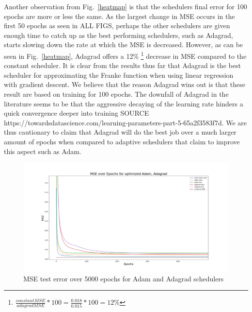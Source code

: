 \documentclass[onecolumn,10pt,cleanfoot]{asme2ej}
\begin{document}
Another observation from Fig.~\ref{heatmap} is that the schedulers final error for 100 epochs are more or less the same. As the largest change in MSE occurs in the first 50 epochs as seen in ALL FIGS, perhaps the other schedulers are given enough time to catch up as the best performing schedulers, such as Adagrad, starts slowing down the rate at which the MSE is decreased. However, as can be seen in Fig.~\ref{heatmap}, Adagrad offers a 12\% \footnote{$\frac{constant MSE}{adagrad MSE} * 100 = \frac{0.018}{0.015} * 100 = 12\%$} decrease in MSE compared to the constant scheduler. It is clear from the results thus far that Adagrad is the best scheduler for approximating the Franke function when using linear regression with gradient descent. We believe that the reason Adagrad wins out is that these result are based on training for 100 epochs. The downfall of Adagrad in the literature seems to be that the aggressive decaying of the learning rate hinders a quick convergence deeper into training SOURCE https://towardsdatascience.com/learning-parameters-part-5-65a2f3583f7d. We are thus cautionary to claim that Adagrad will do the best job over a much larger amount of epochs when compared to adaptive schedulers that claim to improve this aspect such as Adam.

\begin{figure}[h]
\centerline{\includegraphics[width=5in]{figure/5000e_adam_v_adagrad.png}}
\caption{MSE test error over 5000 epochs for Adam and Adagrad schedulers}
\label{adam_v_adagrad}
\end{figure}
\end{document}
